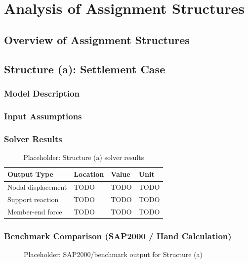 \chapter{Analysis of Assignment Structures}

\section{Overview of Assignment Structures}

\section{Structure (a): Settlement Case}
\subsection{Model Description}

\subsection{Input Assumptions}

\subsection{Solver Results}
\begin{table}[H]
    \centering
    \caption{Placeholder: Structure (a) solver results}
    \label{tab:structure_a_results}
    \begin{tabular}{llll}
        \toprule
        Output Type & Location & Value & Unit \\
        \midrule
        Nodal displacement & TODO & TODO & TODO \\
        Support reaction & TODO & TODO & TODO \\
        Member-end force & TODO & TODO & TODO \\
        \bottomrule
    \end{tabular}
\end{table}

\subsection{Benchmark Comparison (SAP2000 / Hand Calculation)}
\begin{figure}[H]
    \centering
    \caption{Placeholder: SAP2000/benchmark output for Structure (a)}
    \label{fig:structure_a_benchmark}
\end{figure}

